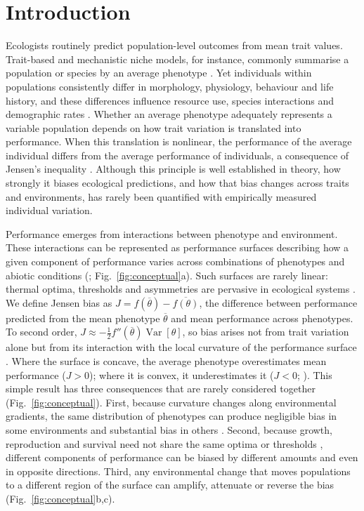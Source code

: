 \documentclass[12pt]{article}
\begin{document}
\newpage

\section{Introduction}

Ecologists routinely predict population-level outcomes from mean trait values. Trait-based and mechanistic niche models, for instance, commonly summarise a population or species by an average phenotype \parencite{kearney2009,laughlin2015,briscoe2023}. Yet individuals within populations consistently differ in morphology, physiology, behaviour and life history, and these differences influence resource use, species interactions and demographic rates \parencite{bolnick2003,bolnick2011,desroches2018}. Whether an average phenotype adequately represents a variable population depends on how trait variation is translated into performance. When this translation is nonlinear, the performance of the average individual differs from the average performance of individuals, a consequence of Jensen's inequality \parencite{jensen1906,ruel1999}. Although this principle is well established in theory, how strongly it biases ecological predictions, and how that bias changes across traits and environments, has rarely been quantified with empirically measured individual variation.

Performance emerges from interactions between phenotype and environment. These interactions can be represented as performance surfaces describing how a given component of performance varies across combinations of phenotypes and abiotic conditions (\cite{laughlin2015,li2021}; Fig.~\ref{fig:conceptual}a). Such surfaces are rarely linear: thermal optima, thresholds and asymmetries are pervasive in ecological systems \parencite{ruel1999,bolnick2011}. We define Jensen bias as $J = f(\overline{\theta}) - \overline{f(\theta)}$, the difference between performance predicted from the mean phenotype $\overline{\theta}$ and mean performance across phenotypes. To second order, $J \approx -\frac{1}{2} f''(\overline{\theta})\operatorname{Var}[\theta]$, so bias arises not from trait variation alone but from its interaction with the local curvature of the performance surface \parencite{denny2017,denny2019}. Where the surface is concave, the average phenotype overestimates mean performance ($J>0$); where it is convex, it underestimates it ($J<0$; \cite{ruel1999,bolnick2011}). This simple result has three consequences that are rarely considered together (Fig.~\ref{fig:conceptual}). First, because curvature changes along environmental gradients, the same distribution of phenotypes can produce negligible bias in some environments and substantial bias in others \parencite{ross2023}. Second, because growth, reproduction and survival need not share the same optima or thresholds \parencite{sinclair2016,kontopoulos2024}, different components of performance can be biased by different amounts and even in opposite directions. Third, any environmental change that moves populations to a different region of the surface can amplify, attenuate or reverse the bias (Fig.~\ref{fig:conceptual}b,c).
\end{document}
